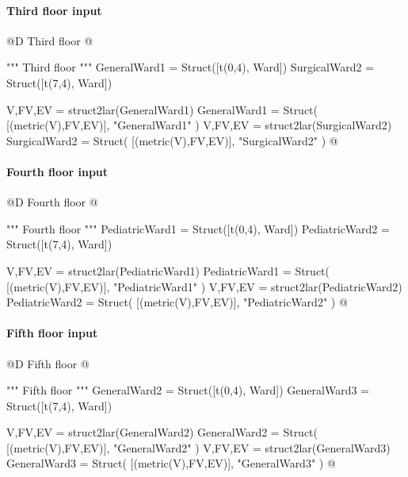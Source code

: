 \documentclass[11pt,oneside]{article}    %
\begin{document}
\paragraph{Third floor input}
@D Third floor
@{""" Third floor """
GeneralWard1 = Struct([t(0,4), Ward])
SurgicalWard2 = Struct([t(7,4), Ward])

V,FV,EV = struct2lar(GeneralWard1)
GeneralWard1 = Struct( [(metric(V),FV,EV)], "GeneralWard1" )
V,FV,EV = struct2lar(SurgicalWard2)
SurgicalWard2 = Struct( [(metric(V),FV,EV)], "SurgicalWard2" )
@}

\paragraph{Fourth floor input}
@D Fourth floor
@{""" Fourth floor """
PediatricWard1 = Struct([t(0,4), Ward])
PediatricWard2 = Struct([t(7,4), Ward]) 

V,FV,EV = struct2lar(PediatricWard1)
PediatricWard1 = Struct( [(metric(V),FV,EV)], "PediatricWard1" )
V,FV,EV = struct2lar(PediatricWard2)
PediatricWard2 = Struct( [(metric(V),FV,EV)], "PediatricWard2" )
@}

\paragraph{Fifth floor input}
@D Fifth floor
@{""" Fifth floor """
GeneralWard2 = Struct([t(0,4), Ward])
GeneralWard3 = Struct([t(7,4), Ward]) 

V,FV,EV = struct2lar(GeneralWard2)
GeneralWard2 = Struct( [(metric(V),FV,EV)], "GeneralWard2" )
V,FV,EV = struct2lar(GeneralWard3)
GeneralWard3 = Struct( [(metric(V),FV,EV)], "GeneralWard3" )
@}
\end{document}
